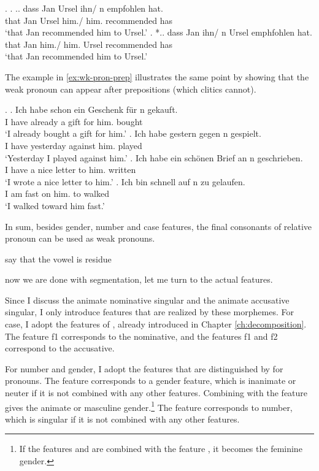 \ex.\label{ex:wk-pron-order}
\ag. .. dass Jan Ursel ihn/ n empfohlen hat.\\
 {} that Jan Ursel him./ him. recommended has\\
 `that Jan recommended him to Ursel.'
\bg. *.. dass Jan ihn/ n Ursel emphfohlen hat.\\
 {} that Jan him./ him. Ursel recommended has\\
 `that Jan recommended him to Ursel.'

The example in \ref{ex:wk-pron-prep} illustrates the same point by showing that the weak pronoun can appear after prepositions (which clitics cannot).

\ex.\label{ex:wk-pron-prep}
\ag. Ich habe schon ein Geschenk für n gekauft.\\
 I have already a gift for him. bought\\
 `I already bought a gift for him.'
\bg. Ich habe gestern gegen n gespielt.\\
I have yesterday against him. played\\
`Yesterday I played against him.'
\bg. Ich habe ein schönen Brief an n geschrieben.\\
I have a nice letter to him. written\\
`I wrote a nice letter to him.'
\bg. Ich bin schnell auf n zu gelaufen.\\
I am fast on him. to walked\\
`I walked toward him fast.'

In sum, besides gender, number and case features, the final consonants of relative pronoun can be used as weak pronouns.

say that the vowel is residue

now we are done with segmentation, let me turn to the actual features.

Since I discuss the animate nominative singular and the animate accusative singular, I only introduce features that are realized by these morphemes.
For case, I adopt the features of \citet{caha2009}, already introduced in Chapter \ref{ch:decomposition}. The feature \ac{f}1 corresponds to the nominative, and the features \ac{f}1 and \ac{f}2 correspond to the accusative.

For number and gender, I adopt the features that are distinguished by \citet{harley2002} for pronouns. The feature  corresponds to a gender feature, which is inanimate or neuter if it is not combined with any other features. Combining  with the feature  gives the animate or masculine gender.\footnote{
If the features  and  are combined with the feature , it becomes the feminine gender.
}
The feature  corresponds to number, which is singular if it is not combined with any other features.

